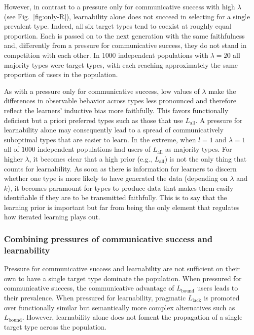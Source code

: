 \documentclass[a4paper, 11pt]{article}
\theoremstyle{Satz}
\newcommand{\mylang}[1]{\ensuremath{L_{\text{#1}}}\xspace} %
\newcommand{\Lall}{\mylang{all}}
\newcommand{\Lbound}{\mylang{bound}}
\newcommand{\Llack}{\mylang{lack}}
\begin{document}
However, in contrast to a pressure only for communicative success with high $\lambda$ (see
Fig.~\ref{fig:only-R}), learnability alone does not succeed in selecting for a single
prevalent type. Indeed, all six target types tend to coexist at roughly equal proportion. Each
is passed on to the next generation with the same faithfulness and, differently from a pressure
for communicative success, they do not stand in competition with each other. In $1000$
independent populations with $\lambda = 20$ all majority types were target types,
with each reaching approximately the same proportion of users in the population.

As
with a pressure only for communicative success, low values of $\lambda$ make the differences in observable behavior
across types less pronounced and therefore reflect the learners' inductive bias more
faithfully. This favors functionally deficient but a priori preferred types such as those that use
$\Lall$. A pressure for learnability alone may consequently lead to a spread of communicatively
suboptimal types that are easier to learn. In the extreme, when $l = 1$ and $\lambda = 1$ all
of $1000$ independent populations had users of $\Lall$ as majority types. For higher $\lambda$, it becomes clear that a high prior (e.g., $\Lall$) is not the only thing that counts for learnability. As soon as there is information for learners to discern whether one type is more likely to have generated the data (depending on $\lambda$ and $k$), it becomes paramount for types to produce data that makes them easily identifiable if they are to be transmitted faithfully. This is to say that the learning prior is important but far from being the only element that regulates how iterated learning plays out.  


\subsubsection{Combining pressures of communicative success and learnability}

Pressure for communicative success and learnability are not sufficient on their own to have a
single target type dominate the population. When pressured for communicative success, the  communicative advantage of $\Lbound$ users leads to their prevalence. When pressured for
learnability, pragmatic $\Llack$ is promoted over functionally similar but semantically more
complex alternatives such as $\Lbound$. However, learnability alone does not foment the
propagation of a single target type across the population.
\end{document}
